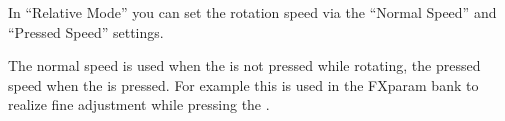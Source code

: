 In ``Relative Mode'' you can set the rotation speed via the ``Normal Speed''
and ``Pressed Speed'' settings.

The normal speed is used when the \vpot is not
pressed while rotating, the pressed speed when the \vpot is
pressed. For example this is
used in the FXparam bank to realize fine adjustment
while pressing the \vpots. 
\WFclear



